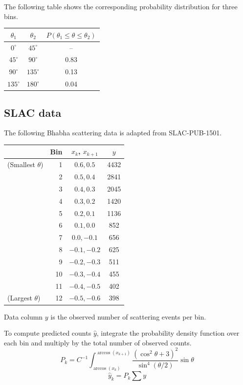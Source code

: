 \documentclass[12pt]{article}
\begin{document}
\noindent
The following table shows the corresponding probability distribution for three bins.

\begin{center}
\begin{tabular}{|c|c|c|}
\hline
$\theta_1$ & $\theta_2$ & $P(\theta_1\le\theta\le\theta_2)$\\
\hline
$0^\circ$ & $45^\circ$ & -- \\
$45^\circ$ & $90^\circ$ & 0.83 \\
$90^\circ$ & $135^\circ$ & 0.13 \\
$135^\circ$ & $180^\circ$ & 0.04 \\
\hline
\end{tabular}
\end{center}

\subsection*{SLAC data}
\noindent
The following Bhabha scattering data is adapted from SLAC-PUB-1501.

\begin{center}
\begin{tabular}{|lr|c|c|}
\hline
& Bin & $x_k$, $x_{k+1}$ & $y$\\
\hline
(Smallest $\theta$) & 1 & $0.6, 0.5$ & 4432\\
& 2 & $0.5, 0.4$ & 2841\\
& 3 & $0.4, 0.3$ & 2045\\
& 4 & $0.3, 0.2$ & 1420\\
& 5 & $0.2, 0.1$ & 1136\\
& 6 & $0.1, 0.0$ & 852\\
& 7 & $0.0, -0.1$ & 656\\
& 8 & $-0.1, -0.2$ & 625\\
& 9 & $-0.2, -0.3$ & 511\\
& 10 & $-0.3, -0.4$ & 455\\
& 11 & $-0.4, -0.5$ & 402\\
(Largest $\theta$) & 12 & $-0.5, -0.6$ & 398\\
\hline
\end{tabular}
\end{center}

\noindent
Data column $y$ is the observed number of scattering events per bin.

\bigskip
\noindent
To compute predicted counts $\hat{y}$, integrate the probability density function
over each bin and multiply by the total number of observed counts.
\begin{equation*}
P_k=C^{-1}\int_{\arccos(x_k)}^{\arccos(x_{k+1})}
\frac{\left(\cos^2\theta+3\right)^2}{\sin^4(\theta/2)}\sin\theta
\end{equation*}
\begin{equation*}
\hat{y}_k=P_k\sum y
\end{equation*}
\end{document}
